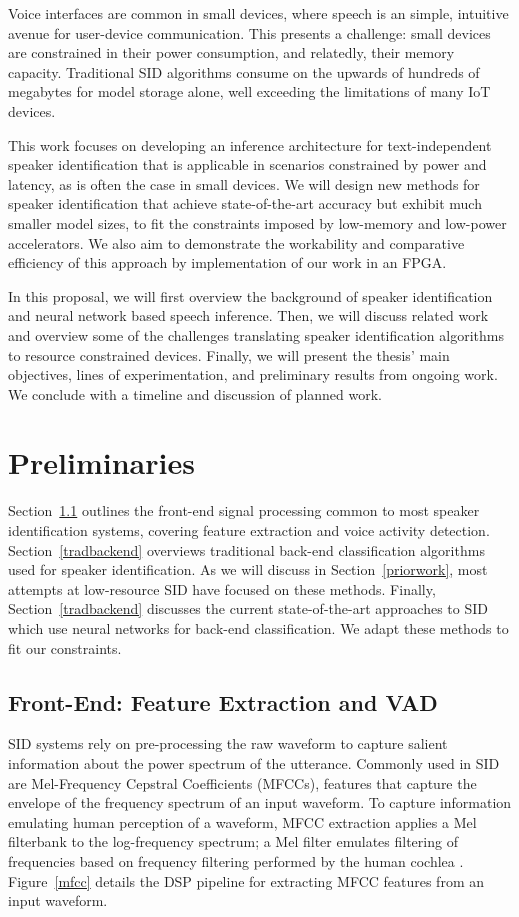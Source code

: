 \documentclass[journal,12pt,onecolumn,draftclsnofoot,]{sty/IEEEtran}
\begin{document}
Voice interfaces are common in small devices, where speech is an simple, intuitive avenue for user-device communication. This presents a challenge: small devices are constrained in their power consumption, and relatedly, their memory capacity. Traditional SID algorithms consume on the upwards of hundreds of megabytes for model storage alone, well exceeding the limitations of many IoT devices.

This work focuses on developing an inference architecture for text-independent speaker identification that is applicable in scenarios constrained by power and latency, as is often the case in small devices. We will design new methods for speaker identification that achieve state-of-the-art accuracy but exhibit much smaller model sizes, to fit the constraints imposed by low-memory and low-power accelerators. We also aim to demonstrate the workability and comparative efficiency of this approach by implementation of our work in an FPGA.

In this proposal, we will first overview the background of speaker identification and neural network based speech inference. Then, we will discuss related work and overview some of the challenges translating speaker identification algorithms to resource constrained devices. Finally, we will present the thesis’ main objectives, lines of experimentation, and preliminary results from ongoing work. We conclude with a timeline and discussion of planned work.


\section{Preliminaries}
Section~\ref{frontend} outlines the front-end signal processing common to most speaker identification systems, covering feature extraction and voice activity detection. Section~\ref{tradbackend} overviews traditional back-end classification algorithms used for speaker identification. As we will discuss in Section~\ref{priorwork}, most attempts at low-resource SID have focused on these methods. Finally, Section~\ref{tradbackend} discusses the current state-of-the-art approaches to SID which use neural networks for back-end classification. We adapt these methods to fit our constraints.

\subsection{Front-End: Feature Extraction and VAD}
\label{frontend}
SID systems rely on pre-processing the raw waveform to capture salient information about the power spectrum of the utterance. Commonly used in SID are Mel-Frequency Cepstral Coefficients (MFCCs), features that capture the envelope of the frequency spectrum of an input waveform. To capture information emulating human perception of a waveform, MFCC extraction applies a Mel filterbank to the log-frequency spectrum; a Mel filter emulates filtering of frequencies based on frequency filtering performed by the human cochlea \cite{mfcc_pres}. Figure~\ref{mfcc} details the DSP pipeline for extracting MFCC features from an input waveform.
\end{document}
